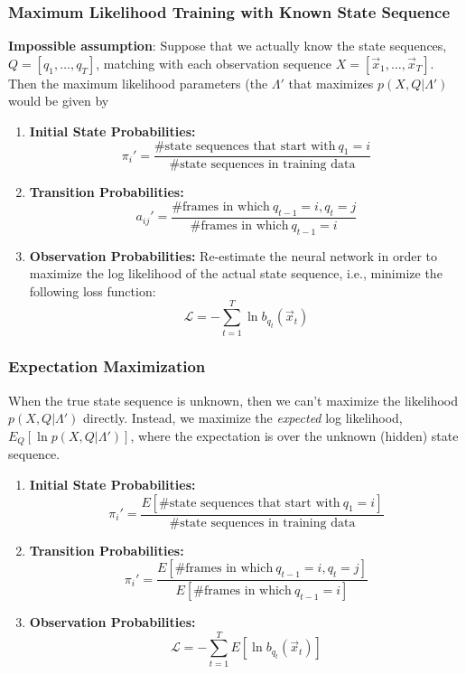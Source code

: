 \documentclass{beamer}
\begin{document}
\begin{frame}
  \frametitle{Maximum Likelihood Training with Known State Sequence}

  {\bf Impossible assumption}: Suppose that we actually know the state
  sequences, $Q=[q_1,\ldots,q_T]$, matching with each observation
  sequence $X=[\vec{x}_1,\ldots,\vec{x}_T]$.  Then the maximum
  likelihood parameters (the $\Lambda'$ that maximizes
  $p(X,Q|\Lambda')$ would be given by
  \begin{enumerate}
  \item {\bf Initial State Probabilities:}
    \[
    \pi_i'=\frac{\mbox{\# state sequences that start with}~q_1=i}{\mbox{\# state sequences in training data}}
    \]
  \item {\bf Transition Probabilities:}
    \[
    a_{ij}'=\frac{\mbox{\# frames in which}~q_{t-1}=i,q_t=j}{\mbox{\# frames in which}~q_{t-1}=i}
    \]
  \item {\bf Observation Probabilities:} Re-estimate the neural
    network in order to maximize the log likelihood of the actual
    state sequence, i.e., minimize the following loss function:
    \[
    {\mathcal L}= -\sum_{t=1}^T \ln b_{q_t}(\vec{x}_t)
    \]
  \end{enumerate}
\end{frame}
  
\begin{frame}
  \frametitle{Expectation Maximization}

  When the true state sequence is unknown, then we can't maximize the
  likelihood $p(X,Q|\Lambda')$ directly.  Instead, we maximize the {\em
    expected} log likelihood, $E_Q\left[\ln p(X,Q|\Lambda')\right]$,
  where the expectation is over the unknown (hidden) state sequence.
  \begin{enumerate}
  \item {\bf Initial State Probabilities:}
    \[
    \pi_i'=\frac{E\left[\mbox{\# state sequences that start with}~q_1=i\right]}{\mbox{\# state sequences in training data}}
    \]
  \item {\bf Transition Probabilities:}
    \[
    \pi_i'=\frac{E\left[\mbox{\# frames in which}~q_{t-1}=i,q_t=j\right]}{E\left[\mbox{\# frames in which}~q_{t-1}=i\right]}
    \]
  \item {\bf Observation Probabilities:} 
    \[
    {\mathcal L}= -\sum_{t=1}^T E\left[\ln b_{q_t}(\vec{x}_t)\right]
    \]
  \end{enumerate}
\end{frame}
\end{document}
